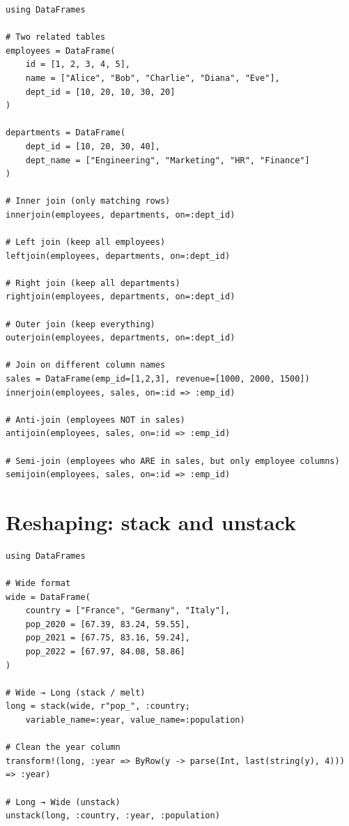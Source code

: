 \begin{verbatim}
using DataFrames

# Two related tables
employees = DataFrame(
    id = [1, 2, 3, 4, 5],
    name = ["Alice", "Bob", "Charlie", "Diana", "Eve"],
    dept_id = [10, 20, 10, 30, 20]
)

departments = DataFrame(
    dept_id = [10, 20, 30, 40],
    dept_name = ["Engineering", "Marketing", "HR", "Finance"]
)

# Inner join (only matching rows)
innerjoin(employees, departments, on=:dept_id)

# Left join (keep all employees)
leftjoin(employees, departments, on=:dept_id)

# Right join (keep all departments)
rightjoin(employees, departments, on=:dept_id)

# Outer join (keep everything)
outerjoin(employees, departments, on=:dept_id)

# Join on different column names
sales = DataFrame(emp_id=[1,2,3], revenue=[1000, 2000, 1500])
innerjoin(employees, sales, on=:id => :emp_id)

# Anti-join (employees NOT in sales)
antijoin(employees, sales, on=:id => :emp_id)

# Semi-join (employees who ARE in sales, but only employee columns)
semijoin(employees, sales, on=:id => :emp_id)
\end{verbatim}

\section{Reshaping: stack and unstack}

\begin{verbatim}
using DataFrames

# Wide format
wide = DataFrame(
    country = ["France", "Germany", "Italy"],
    pop_2020 = [67.39, 83.24, 59.55],
    pop_2021 = [67.75, 83.16, 59.24],
    pop_2022 = [67.97, 84.08, 58.86]
)

# Wide → Long (stack / melt)
long = stack(wide, r"pop_", :country;
    variable_name=:year, value_name=:population)

# Clean the year column
transform!(long, :year => ByRow(y -> parse(Int, last(string(y), 4))) => :year)

# Long → Wide (unstack)
unstack(long, :country, :year, :population)
\end{verbatim}

